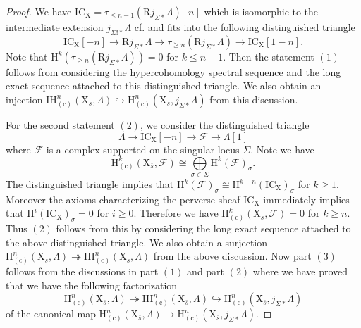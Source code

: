 \documentclass[10pt]{amsart}
\numberwithin{equation}{section}
\theoremstyle{definition}
\def\calF{\mathcal{F}}
\def\rmc{\mathrm{c}}
\def\rmH{\mathrm{H}}
\def\rmR{\mathrm{R}}
\def\rmX{\mathrm{X}}
\begin{document}
\begin{proof}
We have $\mathrm{IC}_{\rmX}=\tau_{\leq n-1}(\rmR j_{\Sigma\ast}\Lambda)[n]$ which is isomorphic to the intermediate extension $j_{\Sigma!\ast}\Lambda$ cf. \cite[2.2.3.1]{BBD} and fits into the following distinguished triangle
\begin{equation*}
\mathrm{IC}_{\rmX}[-n]\rightarrow\mathrm{R}j_{\Sigma\ast}\Lambda\rightarrow\tau_{\geq n}(\rmR j_{\Sigma\ast}\Lambda)\rightarrow\mathrm{IC}_{\rmX}[1-n].
\end{equation*}
 Note that $\rmH^{k}(\tau_{\geq n}(\rmR j_{\Sigma\ast}\Lambda))=0$ for $k\leq n-1$. Then the statement $(1)$ follows from considering the hypercohomology spectral sequence and the long exact sequence attached to this distinguished triangle.  We also obtain an injection $\mathrm{IH}^{n}_{(\rmc)}(\rmX_{\overline{s}}, \Lambda)\hookrightarrow \rmH^{n}_{(\rmc)}(\rmX_{\overline{s}}, j_{\Sigma\ast}\Lambda)$ from this discussion.

For the second statement $(2)$, we consider the distinguished triangle
\begin{equation*}
\Lambda\rightarrow \mathrm{IC}_{\rmX}[-n]\rightarrow \calF\rightarrow\Lambda[1]
\end{equation*}
where $\calF$ is a complex supported on the singular locus $\Sigma$. Note we have
\begin{equation*}
\rmH^{k}_{(\rmc)}(\rmX_{\overline{s}}, \calF)\cong \bigoplus\limits_{\sigma\in\Sigma}\rmH^{k}(\calF)_{\sigma}.
\end{equation*}
The distinguished triangle implies that $\rmH^{k}(\calF)_{\sigma}\cong\rmH^{k-n}(\mathrm{IC}_{\rmX})_{\sigma}$ for $k\geq 1$. Moreover the axioms \cite[Proposition 2.1.17]{BBD} characterizing the perverse sheaf $\mathrm{IC}_{\rmX}$ immediately implies that $\rmH^{i}(\mathrm{IC}_{\rmX})_{\sigma}=0$ for $i\geq 0$. Therefore we have
$\rmH^{k}_{(\rmc)}(\rmX_{\overline{s}}, \calF)=0$ for $k\geq n$. Thus $(2)$ follows from this by considering the long exact sequence attached to the above distinguished triangle. We also obtain a surjection $\mathrm{H}^{n}_{(\rmc)}(\rmX_{\overline{s}}, \Lambda)\twoheadrightarrow \mathrm{IH}^{n}_{(\rmc)}(\rmX_{\overline{s}}, \Lambda)$ from the above discussion. Now part $(3)$ follows from the discussions in part $(1)$ and part $(2)$ where we have proved that we have the following factorization
\begin{equation*}
\mathrm{H}^{n}_{(\rmc)}(\rmX_{\overline{s}}, \Lambda)\twoheadrightarrow \mathrm{IH}^{n}_{(\rmc)}(\rmX_{\overline{s}}, \Lambda)\hookrightarrow \mathrm{H}^{n}_{(\rmc)}(\rmX_{\overline{s}}, j_{\Sigma\ast}\Lambda)
\end{equation*}
of the canonical map $\mathrm{H}^{n}_{(\rmc)}(\rmX_{\overline{s}}, \Lambda)\rightarrow \mathrm{H}^{n}_{(\rmc)}(\rmX_{\overline{s}}, j_{\Sigma\ast}\Lambda)$.


\end{proof}
\end{document}
